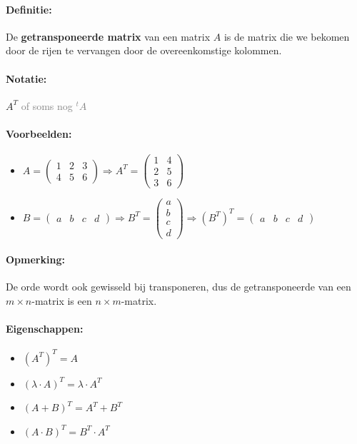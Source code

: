 \documentclass[12pt,twoside]{article}
\begin{document}
\paragraph*{Definitie:} De {\bf getransponeerde matrix} van een matrix $A$ is de matrix die we bekomen door de rijen te vervangen door de overeenkomstige kolommen.

\paragraph*{Notatie:} $A^T$ \textcolor{gray}{of soms nog ${}^tA$}

\paragraph*{Voorbeelden:}
\begin{itemize}
\item $A=
  \begin{pmatrix}
    1 & 2 & 3\\
    4 & 5 & 6
  \end{pmatrix} \Rightarrow
  A^T=
  \begin{pmatrix}
    1 & 4\\
    2 & 5\\
    3 & 6
  \end{pmatrix}
  $
\item $B=
  \begin{pmatrix}
    a & b & c & d
  \end{pmatrix} \Rightarrow
  B^T=
  \begin{pmatrix}
    a\\
    b\\
    c\\
    d
  \end{pmatrix} \Rightarrow
  \left(B^T\right)^T=
  \begin{pmatrix}
    a & b & c & d
  \end{pmatrix}
  $
\end{itemize}

\paragraph*{Opmerking:} De orde wordt ook gewisseld bij transponeren, dus de getransponeerde van een $m \times n$-matrix is een $n \times m$-matrix.

\paragraph*{Eigenschappen:}
\begin{itemize}
\item $(A^T)^T=A$
\item $(\lambda \cdot A)^T=\lambda \cdot A^T$
\item $(A + B)^T = A^T + B^T$
\item $(A \cdot B)^T = B^T \cdot A^T$
\end{itemize}
\end{document}
